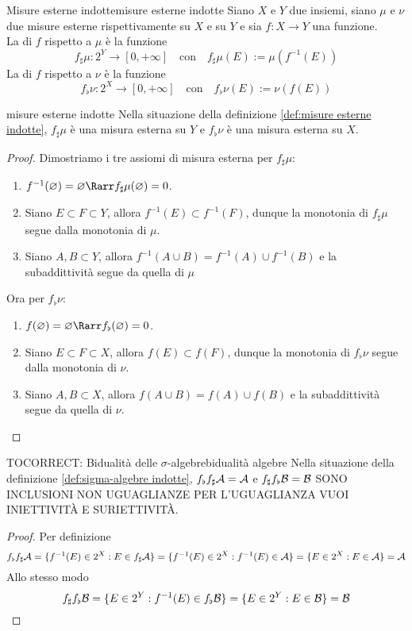 \documentclass{article}
\renewcommand\A{\mc{A}}
\begin{document}
\begin{definition}{Misure esterne indotte}{misure esterne indotte}
    Siano $X$ e $Y$ due insiemi, siano $\mu$ e $\nu$ due misure esterne rispettivamente su $X$ e su $Y$ e sia $f:X\to Y$ una funzione.\\
    La  di $f$ rispetto a $\mu$ è la funzione
    \[f_\sharp\mu : 2^Y \to [0,+\infty] \quad \text{con} \quad f_\sharp\mu(E):= \mu(f^{-1}(E)) \]
    La  di $f$ rispetto a $\nu$ è la funzione
    \[f_\flat\nu : 2^X \to [0,+\infty] \quad \text{con} \quad f_\flat\nu(E) := \nu(f(E))\]
\end{definition}
\begin{proposition}{}{misure esterne indotte}
    Nella situazione della definizione \ref{def:misure esterne indotte}, $f_\sharp\mu$ è una misura esterna su $Y$ e $f_\flat\nu$ è una misura esterna su $X$.
    \begin{proof}
        Dimostriamo i tre assiomi di misura esterna per $f_\sharp\mu$:\begin{enumerate}
            \item $f^{-1}(\varnothing) = \varnothing \Rarr f_\sharp\mu(\varnothing) = 0$.
            \item Siano $E \subset F \subset Y$, allora $f^{-1}(E)\subset f^{-1}(F)$, dunque la monotonia di $f_\sharp\mu$ segue dalla monotonia di $\mu$.
            \item Siano $A,B \subset Y$, allora $f^{-1}(A\cup B)= f^{-1}(A) \cup f^{-1}(B)$ e la subaddittività segue da quella di $\mu$
        \end{enumerate}
        Ora per $f_\flat\nu$:\begin{enumerate}
            \item $f(\varnothing) = \varnothing \Rarr f_\flat(\varnothing) = 0$.
            \item Siano $E \subset F \subset X$, allora $f(E)\subset f(F)$, dunque la monotonia di $f_\flat\nu$ segue dalla monotonia di $\nu$.
            \item Siano $A,B \subset X$, allora $f(A \cup B) = f(A)\cup f(B)$ e la subaddittività segue da quella di $\nu$.
        \end{enumerate}
    \end{proof}
\end{proposition}

\begin{remark}{TOCORRECT: Bidualità delle $\sigma$-algebre}{bidualità algebre}
    Nella situazione della definizione \ref{def:sigma-algebre indotte}, $f_\flat f_\sharp \A = \A$ e $f_\sharp f_\flat \mathcal{B} = \mathcal{B}$ SONO INCLUSIONI NON UGUAGLIANZE PER L'UGUAGLIANZA VUOI INIETTIVITÀ E SURIETTIVITÀ.
    \begin{proof}
        Per definizione
        \[f_\flat f_\sharp \A = \{ f^{-1}(E) \in 2^X : E \in f_\sharp \A\} = \{f^{-1}(E) \in 2^X : f^{-1}(E) \in \A\} = \{E \in 2^X : E \in \A\} = \A\]
        Allo stesso modo
        \[f_\sharp f_\flat \mathcal{B} = \{ E \in 2^Y : f^{-1}(E) \in f_\flat \mathcal{B} \} = \{ E \in 2^Y : E \in \mathcal{B}\} = \mathcal{B}\]
    \end{proof}
\end{remark}
\end{document}
